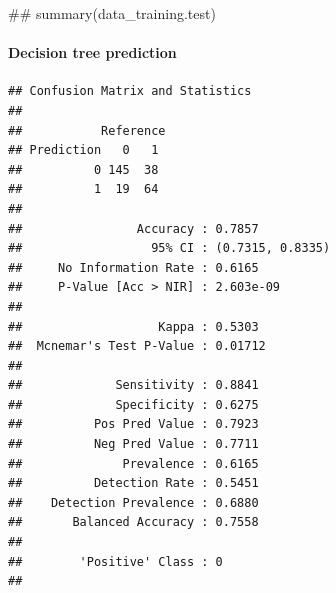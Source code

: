 \documentclass[]{article}
\newenvironment{Shaded}{\begin{snugshade}}{\end{snugshade}}
\newcommand{\KeywordTok}[1]{\textcolor[rgb]{0.13,0.29,0.53}{\textbf{{#1}}}}
\newcommand{\DataTypeTok}[1]{\textcolor[rgb]{0.13,0.29,0.53}{{#1}}}
\newcommand{\DecValTok}[1]{\textcolor[rgb]{0.00,0.00,0.81}{{#1}}}
\newcommand{\StringTok}[1]{\textcolor[rgb]{0.31,0.60,0.02}{{#1}}}
\newcommand{\NormalTok}[1]{{#1}}
\begin{document}
\begin{Shaded}
\begin{Highlighting}[]
\NormalTok{## summary(data_training.test)}
\end{Highlighting}
\end{Shaded}

\paragraph{Decision tree prediction}\label{decision-tree-prediction}

\begin{Shaded}
\end{Shaded}

\begin{verbatim}
## Confusion Matrix and Statistics
## 
##           Reference
## Prediction   0   1
##          0 145  38
##          1  19  64
##                                           
##                Accuracy : 0.7857          
##                  95% CI : (0.7315, 0.8335)
##     No Information Rate : 0.6165          
##     P-Value [Acc > NIR] : 2.603e-09       
##                                           
##                   Kappa : 0.5303          
##  Mcnemar's Test P-Value : 0.01712         
##                                           
##             Sensitivity : 0.8841          
##             Specificity : 0.6275          
##          Pos Pred Value : 0.7923          
##          Neg Pred Value : 0.7711          
##              Prevalence : 0.6165          
##          Detection Rate : 0.5451          
##    Detection Prevalence : 0.6880          
##       Balanced Accuracy : 0.7558          
##                                           
##        'Positive' Class : 0               
## 
\end{verbatim}
\end{document}
